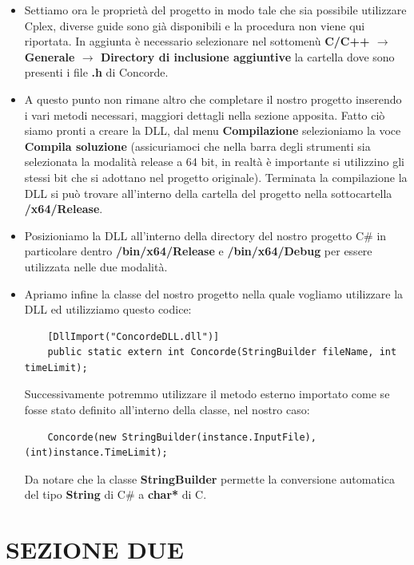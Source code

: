 \documentclass[11pt]{article}
\begin{document}
\begin{itemize}
    \item Settiamo ora le proprietà del progetto in modo tale che sia possibile utilizzare Cplex, diverse guide sono già disponibili e la procedura non viene qui riportata. In aggiunta è necessario selezionare nel sottomenù \textbf{C/C++ $\rightarrow$ Generale $\rightarrow$ Directory di inclusione aggiuntive} la cartella dove sono presenti i file \textbf{.h} di Concorde. 
    
    \item A questo punto non rimane altro che completare il nostro progetto inserendo i vari metodi necessari, maggiori dettagli nella sezione apposita. Fatto ciò siamo pronti a creare la DLL, dal menu \textbf{Compilazione} selezioniamo la voce \textbf{Compila soluzione} (assicuriamoci che nella barra degli strumenti sia selezionata la modalità release a 64 bit, in realtà è importante si utilizzino gli stessi bit che si adottano nel progetto originale). Terminata la compilazione la DLL si può trovare all'interno della cartella del progetto nella sottocartella \textbf{/x64/Release}.
    
    \item Posizioniamo la DLL all'interno della directory del nostro progetto C\# in particolare dentro \textbf{/bin/x64/Release} e \textbf{/bin/x64/Debug} per essere utilizzata nelle due modalità.
    
    \item Apriamo infine la classe del nostro progetto nella quale vogliamo utilizzare la DLL ed utilizziamo questo codice:
    \begin{lstlisting}
    [DllImport("ConcordeDLL.dll")]
    public static extern int Concorde(StringBuilder fileName, int timeLimit);
    \end{lstlisting} 
    Successivamente potremmo utilizzare il metodo esterno importato come se fosse stato definito all'interno della classe, nel nostro caso:
    \begin{lstlisting}
    Concorde(new StringBuilder(instance.InputFile), (int)instance.TimeLimit);
    \end{lstlisting}
    Da notare che la classe \textbf{StringBuilder} permette la conversione automatica del tipo \textbf{String} di C\# a \textbf{char*} di C.
    
\end{itemize}

\section*{SEZIONE DUE}
\end{document}
